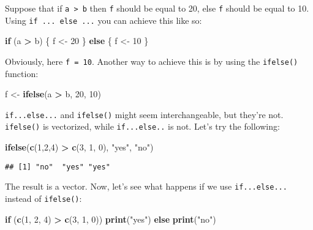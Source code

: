 \documentclass[
]{article}
\newenvironment{Shaded}{\begin{snugshade}}{\end{snugshade}}
\newcommand{\ControlFlowTok}[1]{\textcolor[rgb]{0.13,0.29,0.53}{\textbf{#1}}}
\newcommand{\DecValTok}[1]{\textcolor[rgb]{0.00,0.00,0.81}{#1}}
\newcommand{\KeywordTok}[1]{\textcolor[rgb]{0.13,0.29,0.53}{\textbf{#1}}}
\newcommand{\NormalTok}[1]{#1}
\newcommand{\OperatorTok}[1]{\textcolor[rgb]{0.81,0.36,0.00}{\textbf{#1}}}
\newcommand{\StringTok}[1]{\textcolor[rgb]{0.31,0.60,0.02}{#1}}
\begin{document}
Suppose that if \texttt{a\ \textgreater{}\ b} then \texttt{f} should be equal to 20, else \texttt{f} should be equal to 10. Using \texttt{if\ ...\ else\ ...} you can achieve this like so:

\begin{Shaded}
\begin{Highlighting}[]
\ControlFlowTok{if}\NormalTok{ (a }\OperatorTok{\textgreater{}}\StringTok{ }\NormalTok{b) \{}
\NormalTok{  f \textless{}{-}}\StringTok{ }\DecValTok{20}
\NormalTok{    \} }\ControlFlowTok{else}\NormalTok{ \{}
\NormalTok{  f \textless{}{-}}\StringTok{ }\DecValTok{10}
\NormalTok{\}}
\end{Highlighting}
\end{Shaded}

Obviously, here \texttt{f\ =\ 10}. Another way to achieve this is by using the \texttt{ifelse()} function:

\begin{Shaded}
\begin{Highlighting}[]
\NormalTok{f \textless{}{-}}\StringTok{ }\KeywordTok{ifelse}\NormalTok{(a }\OperatorTok{\textgreater{}}\StringTok{ }\NormalTok{b, }\DecValTok{20}\NormalTok{, }\DecValTok{10}\NormalTok{)}
\end{Highlighting}
\end{Shaded}

\texttt{if...else...} and \texttt{ifelse()} might seem interchangeable, but they're not. \texttt{ifelse()} is vectorized, while
\texttt{if...else..} is not. Let's try the following:

\begin{Shaded}
\begin{Highlighting}[]
\KeywordTok{ifelse}\NormalTok{(}\KeywordTok{c}\NormalTok{(}\DecValTok{1}\NormalTok{,}\DecValTok{2}\NormalTok{,}\DecValTok{4}\NormalTok{) }\OperatorTok{\textgreater{}}\StringTok{ }\KeywordTok{c}\NormalTok{(}\DecValTok{3}\NormalTok{, }\DecValTok{1}\NormalTok{, }\DecValTok{0}\NormalTok{), }\StringTok{"yes"}\NormalTok{, }\StringTok{"no"}\NormalTok{)}
\end{Highlighting}
\end{Shaded}

\begin{verbatim}
## [1] "no"  "yes" "yes"
\end{verbatim}

The result is a vector. Now, let's see what happens if we use \texttt{if...else...} instead of \texttt{ifelse()}:

\begin{Shaded}
\begin{Highlighting}[]
\ControlFlowTok{if}\NormalTok{ (}\KeywordTok{c}\NormalTok{(}\DecValTok{1}\NormalTok{, }\DecValTok{2}\NormalTok{, }\DecValTok{4}\NormalTok{) }\OperatorTok{\textgreater{}}\StringTok{ }\KeywordTok{c}\NormalTok{(}\DecValTok{3}\NormalTok{, }\DecValTok{1}\NormalTok{, }\DecValTok{0}\NormalTok{)) }\KeywordTok{print}\NormalTok{(}\StringTok{"yes"}\NormalTok{) }\ControlFlowTok{else} \KeywordTok{print}\NormalTok{(}\StringTok{"no"}\NormalTok{)}
\end{Highlighting}
\end{Shaded}
\end{document}
